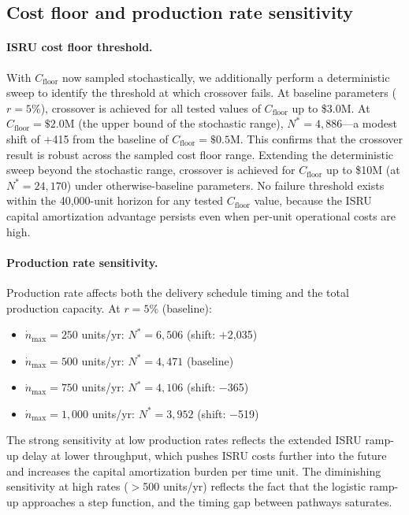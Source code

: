 \documentclass[preprint,12pt]{elsarticle}
\begin{document}
\subsection{Cost floor and production rate sensitivity}
\label{sec:cfloor_prodrate}

\paragraph{ISRU cost floor threshold.} With $C_{\mathrm{floor}}$ now sampled stochastically, we additionally perform a deterministic sweep to identify the threshold at which crossover fails. At baseline parameters ($r = 5\%$), crossover is achieved for all tested values of $C_{\mathrm{floor}}$ up to \$3.0M. At $C_{\mathrm{floor}} = \$2.0$M (the upper bound of the stochastic range), $N^* = 4{,}886$---a modest shift of $+$415 from the baseline of $C_{\mathrm{floor}} = \$0.5$M. This confirms that the crossover result is robust across the sampled cost floor range. Extending the deterministic sweep beyond the stochastic range, crossover is achieved for $C_{\mathrm{floor}}$ up to \$10M (at $N^* = 24{,}170$) under otherwise-baseline parameters. No failure threshold exists within the 40,000-unit horizon for any tested $C_{\mathrm{floor}}$ value, because the ISRU capital amortization advantage persists even when per-unit operational costs are high.

\paragraph{Production rate sensitivity.} Production rate affects both the delivery schedule timing and the total production capacity. At $r = 5\%$ (baseline):

\begin{itemize}
\item $\dot{n}_{\max} = 250$ units/yr: $N^* = 6{,}506$ (shift: $+$2{,}035)
\item $\dot{n}_{\max} = 500$ units/yr: $N^* = 4{,}471$ (baseline)
\item $\dot{n}_{\max} = 750$ units/yr: $N^* = 4{,}106$ (shift: $-$365)
\item $\dot{n}_{\max} = 1{,}000$ units/yr: $N^* = 3{,}952$ (shift: $-$519)
\end{itemize}

The strong sensitivity at low production rates reflects the extended ISRU ramp-up delay at lower throughput, which pushes ISRU costs further into the future and increases the capital amortization burden per time unit. The diminishing sensitivity at high rates ($>$500 units/yr) reflects the fact that the logistic ramp-up approaches a step function, and the timing gap between pathways saturates.
\end{document}
